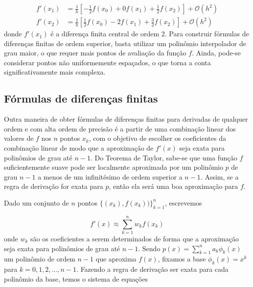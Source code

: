 \documentclass{article}
\begin{document}
\begin{align}
    f'(x_1) & = \frac{1}{h} \left[ -\frac{1}{2}f(x_0) + 0f(x_1) + \frac{1}{2}f(x_2) \right] + \mathcal{O}(h^2) \\
    f'(x_2) & = \frac{1}{h} \left[ \frac{1}{2}f(x_0) - 2f(x_1) + \frac{3}{2}f(x_2) \right] + \mathcal{O}(h^2)
\end{align}
donde \(f'(x_1)\) é a diferença finita central de ordem \(2\). Para construir fórmulas de diferenças finitas de ordem superior, basta utilizar um polinômio interpolador de grau maior, o que requer mais pontos de avaliação da função \(f\). Ainda, pode-se considerar pontos não uniformemente espaçados, o que torna a conta significativamente mais complexa.

\subsection{Fórmulas de diferenças finitas}

Outra maneira de obter fórmulas de diferenças finitas para derivadas de qualquer ordem e com alta ordem de precisão é a partir de uma combinação linear dos valores de \(f\) nos \(n\) pontos \(x_k\), com o objetivo de escolher os coeficientes da combinação linear de modo que a aproximação de \(f'(x)\) seja exata para polinômios de grau até \(n-1\). Do Teorema de Taylor, sabe-se que uma função \(f\) suficientemente suave pode ser localmente aproximada por um polinômio \(p\) de grau \(n-1\) a menos de um infinitésimo de ordem superior a \(n-1\). Assim, se a regra de derivação for exata para \(p\), então ela será uma boa aproximação para \(f\).

Dado um conjunto de \(n\) pontos \(\{(x_k), f(x_k))\}_{k=1}^{n}\), escrevemos

\begin{equation}
    f'(x) \approx \sum_{k=1}^{n} w_k f(x_k)
\end{equation}
onde \(w_k\) são os coeficientes a serem determinados de forma que a aproximação seja exata para polinômios de grau até \(n-1\). Sendo \(p(x) = \sum_{k=1}^{n} a_k \phi_k(x)\) um polinômio de ordem \(n-1\) que aproxima \(f(x)\), fixamos a base \(\phi_k(x) = x^{k}\) para \(k = 0, 1, 2, \ldots, n-1\). Fazendo a regra de derivação ser exata para cada polinômio da base, temos o sistema de equações
\end{document}
